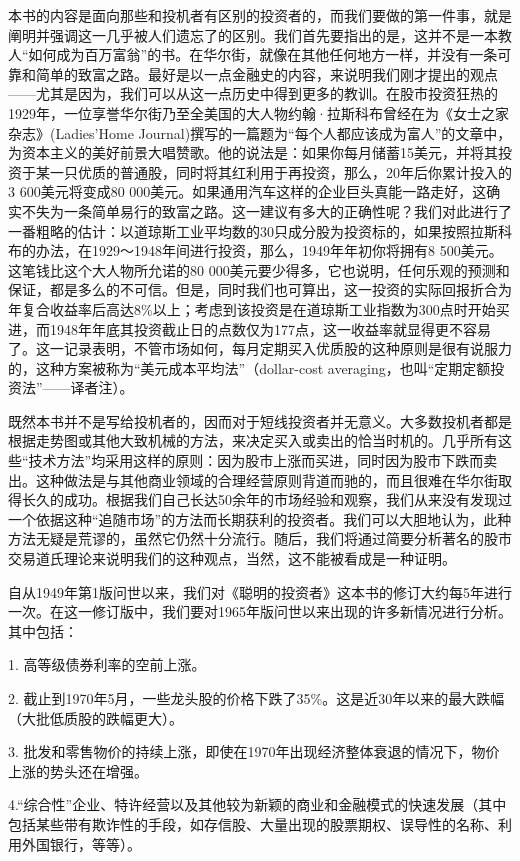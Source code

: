 \documentclass[12pt,oneside]{book}
\begin{document}
本书的内容是面向那些和投机者有区别的投资者的，而我们要做的第一件事，就是阐明并强调这一几乎被人们遗忘了的区别。我们首先要指出的是，这并不是一本教人“如何成为百万富翁”的书。在华尔街，就像在其他任何地方一样，并没有一条可靠和简单的致富之路。最好是以一点金融史的内容，来说明我们刚才提出的观点——尤其是因为，我们可以从这一点历史中得到更多的教训。在股市投资狂热的1929年，一位享誉华尔街乃至全美国的大人物约翰·拉斯科布曾经在为《女士之家杂志》(Ladies'Home Journal)撰写的一篇题为“每个人都应该成为富人”的文章中，为资本主义的美好前景大唱赞歌。他的说法是：如果你每月储蓄15美元，并将其投资于某一只优质的普通股，同时将其红利用于再投资，那么，20年后你累计投入的3 600美元将变成80 000美元。如果通用汽车这样的企业巨头真能一路走好，这确实不失为一条简单易行的致富之路。这一建议有多大的正确性呢？我们对此进行了一番粗略的估计：以道琼斯工业平均数的30只成分股为投资标的，如果按照拉斯科布的办法，在1929～1948年间进行投资，那么，1949年年初你将拥有8 500美元。这笔钱比这个大人物所允诺的80 000美元要少得多，它也说明，任何乐观的预测和保证，都是多么的不可信。但是，同时我们也可算出，这一投资的实际回报折合为年复合收益率后高达8\%以上；考虑到该投资是在道琼斯工业指数为300点时开始买进，而1948年年底其投资截止日的点数仅为177点，这一收益率就显得更不容易了。这一记录表明，不管市场如何，每月定期买入优质股的这种原则是很有说服力的，这种方案被称为“美元成本平均法”（dollar-cost averaging，也叫“定期定额投资法”——译者注）。

既然本书并不是写给投机者的，因而对于短线投资者并无意义。大多数投机者都是根据走势图或其他大致机械的方法，来决定买入或卖出的恰当时机的。几乎所有这些“技术方法”均采用这样的原则：因为股市上涨而买进，同时因为股市下跌而卖出。这种做法是与其他商业领域的合理经营原则背道而驰的，而且很难在华尔街取得长久的成功。根据我们自己长达50余年的市场经验和观察，我们从来没有发现过一个依据这种“追随市场”的方法而长期获利的投资者。我们可以大胆地认为，此种方法无疑是荒谬的，虽然它仍然十分流行。随后，我们将通过简要分析著名的股市交易道氏理论来说明我们的这种观点，当然，这不能被看成是一种证明。

自从1949年第1版问世以来，我们对《聪明的投资者》这本书的修订大约每5年进行一次。在这一修订版中，我们要对1965年版问世以来出现的许多新情况进行分析。其中包括：

1. 高等级债券利率的空前上涨。

2. 截止到1970年5月，一些龙头股的价格下跌了35\%。这是近30年以来的最大跌幅（大批低质股的跌幅更大）。

3. 批发和零售物价的持续上涨，即使在1970年出现经济整体衰退的情况下，物价上涨的势头还在增强。

4.“综合性”企业、特许经营以及其他较为新颖的商业和金融模式的快速发展（其中包括某些带有欺诈性的手段，如存信股、大量出现的股票期权、误导性的名称、利用外国银行，等等）。
\end{document}

